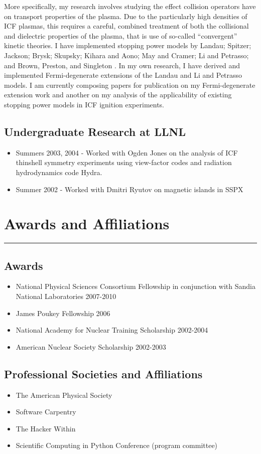 \documentclass[letterpaper,11pt]{article}
\newcommand{\sectionline}{\vspace{-0.05in}\hrule\vspace{0.05in}}
\begin{document}
More specifically, my research involves studying the effect collision operators have on transport properties of the plasma.  Due to the particularly high densities of ICF plasmas, this requires a careful, combined treatment of both the collisional and dielectric properties of the plasma, that is use of so-called ``convergent'' kinetic theories.  I have implemented stopping power models by 
Landau; 
Spitzer; 
Jackson; 
Brysk; 
Skupsky; 
Kihara and Aono; 
May and Cramer; 
Li and Petrasso; 
and 
Brown, Preston, and Singleton%
.
In my own research, I have derived and implemented Fermi-degenerate extensions of the Landau and Li and Petrasso models.  I am currently composing papers for publication on my Fermi-degenerate extension work and another on my analysis of the applicability of existing stopping power models in ICF ignition experiments.  


\subsection*{Undergraduate Research at LLNL}
\begin{itemize}
	\item Summers 2003, 2004 - Worked with Ogden Jones on the analysis of ICF thinshell symmetry experiments using view-factor codes and radiation hydrodynamics code Hydra.
	\item Summer 2002 -  Worked with Dmitri Ryutov on magnetic islands in SSPX
\end{itemize}


\section*{Awards and Affiliations}
\sectionline
\subsection*{Awards}
\begin{itemize}
	\item National Physical Sciences Consortium Fellowship in conjunction with Sandia National Laboratories 2007-2010
	\item James Poukey Fellowship 2006
	\item National Academy for Nuclear Training Scholarship 2002-2004
	\item American Nuclear Society Scholarship 2002-2003
\end{itemize}

\subsection*{Professional Societies and Affiliations}
\begin{itemize}
	\item The American Physical Society
	\item Software Carpentry
	\item The Hacker Within
	\item Scientific Computing in Python Conference (program committee)
\end{itemize}
\end{document}
